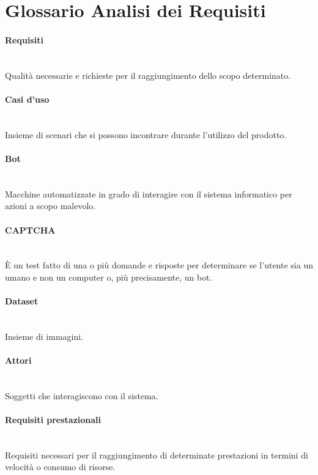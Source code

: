 \section{Glossario Analisi dei Requisiti}

\paragraph{Requisiti}~\smallskip \\
Qualità necessarie e richieste per il raggiungimento dello scopo determinato.

\paragraph{Casi d'uso}~\smallskip \\
Insieme di scenari che si possono incontrare durante l'utilizzo del prodotto.

\paragraph{Bot}~\smallskip \\
Macchine automatizzate in grado di interagire con il sistema informatico per azioni a scopo malevolo.

\paragraph{CAPTCHA}~\smallskip \\
È un test fatto di una o più domande e risposte per determinare se l'utente sia un umano e non un computer o, più precisamente, un bot.

\paragraph{Dataset}~\smallskip \\
Insieme di immagini.

\paragraph{Attori}~\smallskip \\
Soggetti che interagiscono con il sistema.

\paragraph{Requisiti prestazionali}~\smallskip \\
Requisiti necessari per il raggiungimento di determinate prestazioni in termini di velocità o consumo di risorse.

